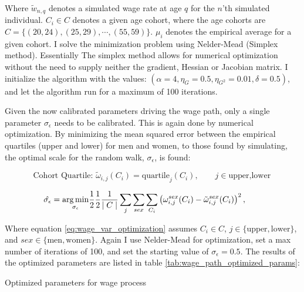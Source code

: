 Where $\tilde{w}_{n, q}$ denotes a simulated wage rate at age $q$ for the $n$'th simulated individual. $C_i \in C$ denotes a given age cohort, where the age cohorts are $C=\{(20, 24), (25, 29), \cdots , (55, 59) \}$. $\mu_i$ denotes the empirical average for a given cohort.
I solve the minimization problem using Nelder-Mead (Simplex method). Essentially The simplex method allows for numerical optimization without the need to supply neither the gradient, Hessian or Jacobian matrix. I initialize the algorithm with the values: $(\alpha=4, \eta_G = 0.5, \eta_{G^2}=0.01, \delta=0.5)$, and let the algorithm run for a maximum of 100 iterations. 

Given the now calibrated parameters driving the wage path, only a single parameter $\sigma_\epsilon$ needs to be calibrated. This is again done by numerical optimization. By minimizing the mean squared error between the empirical quartiles (upper and lower) for men and women, to those found by simulating, the optimal scale for the random walk, $\sigma_\epsilon$, is found:

\begin{equation}
    \text{Cohort Quartile: } {\tilde{\omega}}_{i, j} (C_i) = \text{quartile}_j (C_i), \qquad j\in{\text{upper}, \text{lower}} 
\end{equation}

\begin{equation}\label{eq:wage_var_optimization}
   \hat{\sigma_\epsilon}  = \underset{\sigma_\epsilon}{\operatorname*{arg\,min}} \frac{1}{2}\frac{1}{2}\frac{1}{\mid C \mid } \sum_{j} \sum_{sex}\sum_{C_i} \left( \omega_{i, j}^{sex}(C_i)  - \tilde{\omega}_{i,j}^{sex}(C_i)\right)^2, \qquad 
\end{equation}

Where equation \eqref{eq:wage_var_optimization} assumes $C_i \in C$, $j \in \{\text{upper},  \text{lower} \}$, and $sex \in \{\text{men}, \text{women} \}$. Again I use Nelder-Mead for optimization, set a max number of iterations of 100, and set the starting value of $\sigma_\epsilon = 0.5$. The results of the optimized parameters are listed in table \ref{tab:wage_path_optimized_params}:

\begin{table}[ht]
    \centering
    
    \caption{Optimized parameters for wage process}
    \label{tab:wage_path_optimized_params}
\end{table}

